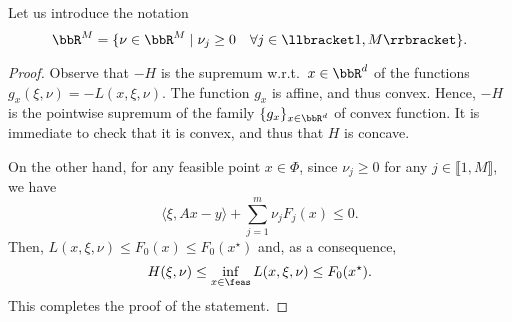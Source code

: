  Let us introduce the notation
 \begin{equation}
     \bbR^M=\{\nu\in \bbR^M\mid \nu_j\ge 0\quad \forall j\in \llbracket 1,M\rrbracket\}.
 \end{equation}
 
 
 
 \begin{proof}
     Observe that $-H$ is the supremum w.r.t.~$x\in \bbR^d$ of the functions $g_x(\xi,\nu) = -L(x,\xi,\nu)$. The function $g_x$ is affine, and thus convex. Hence, $-H$ is the pointwise supremum of the family $\{g_x\}_{x\in\bbR^d}$ of convex function. It is immediate to check that it is convex, and thus that $H$ is concave.
 
     On the other hand, for any feasible point $x\in \Phi$, since $\nu_j\ge 0$ for any $j\in \llbracket1,M\rrbracket$, we have
     \begin{equation}
         \langle \xi, Ax-y\rangle +\sum_{j=1}^m \nu_j F_j(x) \le 0.
     \end{equation}
     Then, $L(x,\xi,\nu)\le F_0(x)\le F_0(x^\star)$ and, as a consequence,
     \begin{equation}
         H(\xi,\nu) \le \inf_{x\in\feas} L(x,\xi,\nu) \le F_0(x^\star).
     \end{equation}
     This completes the proof of the statement.
 \end{proof}
 
